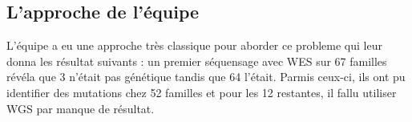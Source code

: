 \subsection{L'approche de l'équipe}

L'équipe a eu une approche très classique pour aborder ce probleme qui leur donna les résultat suivants :
un premier séquensage avec WES sur 67 familles révéla que 3 n'était pas génétique tandis que 64 l'était. Parmis ceux-ci, ils ont pu identifier des mutations chez 52 familles et pour les 12 restantes, il fallu utiliser WGS par manque de résultat.
